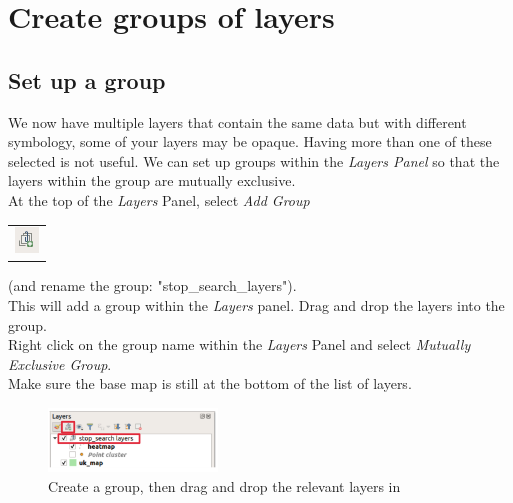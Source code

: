 \chapter{Create groups of layers}

\pagestyle{fancy}
\fancyhf{}
\fancyhead[OC]{\leftmark}
\fancyhead[EC]{\rightmark}
\cfoot{\thepage}


\section{Set up a group}

We now have multiple layers that contain the same data but with different symbology, some of your layers may be opaque. Having more than one of these selected is not useful. We can set up groups within the \textit{Layers Panel} so that the layers within the group are mutually exclusive.\\

At the top of the \textit{Layers} Panel, select \textit{Add Group} 
	\begin{tabular}{@{}c@{}}\includegraphics[width=4ex]{images/add_group_icon.png}\end{tabular}
(and rename the group: "stop\_search\_layers").\\
This will add a group within the \textit{Layers} panel. Drag and drop the layers into the group.\\
Right click on the group name within the \textit{Layers} Panel and select \textit{Mutually Exclusive Group}.\\
Make sure the base map is still at the bottom of the list of layers.

\begin{figure}[!h]
	\centering
	\includegraphics[width=0.4\textwidth]{images/group_layers1.png}
	\caption{Create a group, then drag and drop the relevant layers in}
	\label{ft_fig_firstfig3}
\end{figure}
